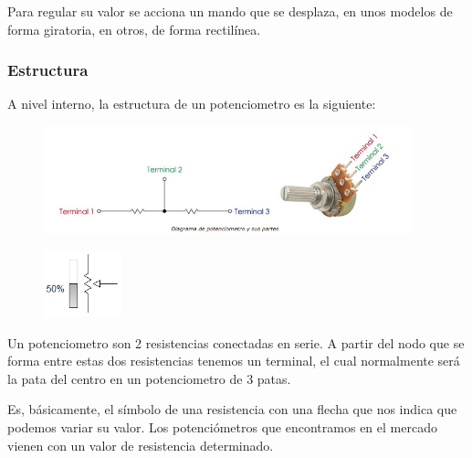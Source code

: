 \documentclass[12pt, fleqn]{article}                            %
\theoremstyle{break}                                            %
\begin{document}
        Para regular su valor se acciona un mando que se desplaza, en unos modelos
        de forma giratoria, en otros, de forma rectilínea.


        \clearpage
        \subsubsection{Estructura}

            A nivel interno, la estructura de un potenciometro es la siguiente:
            \begin{figure}[h]
                \centering
                \includegraphics[width=0.95\textwidth]{Estructura}
            \end{figure}
            
            \begin{figure}
                \centering
                \includegraphics[width=0.20\textwidth]{Potenciometro}
            \end{figure}
            Un potenciometro son 2 resistencias conectadas en serie. A partir del nodo que
            se forma entre estas dos resistencias tenemos un terminal, el cual normalmente
            será la pata del centro en un potenciometro de 3 patas. 

            Es, básicamente, el símbolo de una resistencia con una flecha que nos indica que
            podemos variar su valor. Los potenciómetros que encontramos en el mercado vienen
            con un valor de resistencia determinado.


\end{document}
